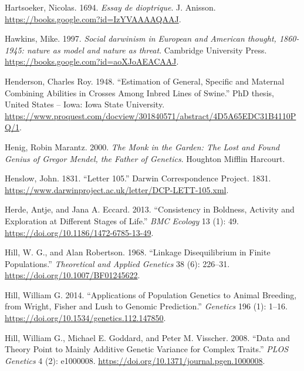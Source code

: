 \documentclass[
]{book}
\newlength{\cslhangindent}
\newlength{\cslentryspacingunit} %
\newenvironment{CSLReferences}[2] %
 {%
  \setlength{\parindent}{0pt}
  \ifodd #1
  \let\oldpar\par
  \def\par{\hangindent=\cslhangindent\oldpar}
  \fi
  \setlength{\parskip}{#2\cslentryspacingunit}
 }%
 {}
\begin{document}
\begin{CSLReferences}{1}{0}
\leavevmode{}%
Hartsoeker, Nicolas. 1694. \emph{Essay de dioptrique}. {J. Anisson}. \url{https://books.google.com?id=IzYVAAAAQAAJ}.

\leavevmode{}%
Hawkins, Mike. 1997. \emph{Social darwinism in European and American thought, 1860-1945: nature as model and nature as threat}. {Cambridge University Press}. \url{https://books.google.com?id=aoXJoAEACAAJ}.

\leavevmode{}%
Henderson, Charles Roy. 1948. {``Estimation of General, Specific and Maternal Combining Abilities in Crosses Among Inbred Lines of Swine.''} PhD thesis, {United States -- Iowa}: {Iowa State University}. \url{https://www.proquest.com/docview/301840571/abstract/4D5A65EDC31B4110PQ/1}.

\leavevmode{}%
Henig, Robin Marantz. 2000. \emph{The {Monk} in the {Garden}: {The Lost} and {Found Genius} of {Gregor Mendel}, the {Father} of {Genetics}}. {Houghton Mifflin Harcourt}.

\leavevmode{}%
Henslow, John. 1831. {``Letter 105.''} {Darwin Correspondence Project}. 1831. \url{https://www.darwinproject.ac.uk/letter/DCP-LETT-105.xml}.

\leavevmode{}%
Herde, Antje, and Jana A. Eccard. 2013. {``Consistency in Boldness, Activity and Exploration at Different Stages of Life.''} \emph{BMC Ecology} 13 (1): 49. \url{https://doi.org/10.1186/1472-6785-13-49}.

\leavevmode{}%
Hill, W. G., and Alan Robertson. 1968. {``Linkage Disequilibrium in Finite Populations.''} \emph{Theoretical and Applied Genetics} 38 (6): 226--31. \url{https://doi.org/10.1007/BF01245622}.

\leavevmode{}%
Hill, William G. 2014. {``Applications of {Population Genetics} to {Animal Breeding}, from {Wright}, {Fisher} and {Lush} to {Genomic Prediction}.''} \emph{Genetics} 196 (1): 1--16. \url{https://doi.org/10.1534/genetics.112.147850}.

\leavevmode{}%
Hill, William G., Michael E. Goddard, and Peter M. Visscher. 2008. {``Data and {Theory Point} to {Mainly Additive Genetic Variance} for {Complex Traits}.''} \emph{PLOS Genetics} 4 (2): e1000008. \url{https://doi.org/10.1371/journal.pgen.1000008}.


\end{CSLReferences}
\end{document}
